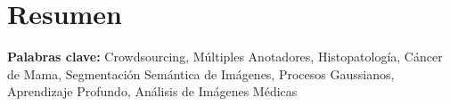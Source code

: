 \cleardoublepage
\chapter*{Resumen}

\textbf{\small Palabras clave:} Crowdsourcing, Múltiples Anotadores,
Histopatología, Cáncer de Mama, Segmentación Semántica de Imágenes,
Procesos Gaussianos, Aprendizaje Profundo, Análisis de Imágenes Médicas
